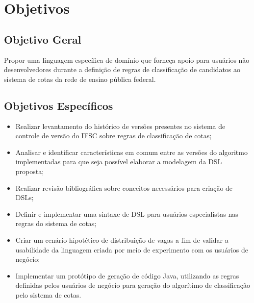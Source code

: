 \section{Objetivos}
\label{objetivos}

\subsection{Objetivo Geral}
\label{objetivogeral}

Propor uma linguagem específica de domínio que forneça apoio para usuários não desenvolvedores durante a definição de regras de classificação de candidatos ao sistema de cotas da rede de ensino pública federal.

\subsection{Objetivos Específicos}
\label{objetivosespecificos}

\begin{itemize}
    \item Realizar levantamento do histórico de versões presentes no sistema de controle de versão do \gls{IFSC} sobre regras de classificação de cotas;
    \item Analisar e identificar características em comum entre as versões do algoritmo implementadas para que seja possível elaborar a modelagem da \gls{DSL} proposta;
    \item Realizar revisão bibliográfica sobre conceitos necessários para criação de \gls{DSL}s;
    \item Definir e implementar uma sintaxe de \gls{DSL} para usuários especialistas nas regras do sistema de cotas;
    \item Criar um cenário hipotético de distribuição de vagas a fim de validar a usabilidade da linguagem criada por meio de experimento com os usuários de negócio;
    \item Implementar um protótipo de geração de código Java, utilizando as regras definidas pelos usuários de negócio para geração do algorítimo de classificação pelo sistema de cotas.
\end{itemize}{}